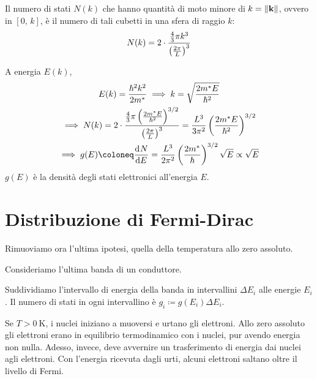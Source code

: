 Il numero di stati $N(k)$ che hanno quantità di moto minore di $k = \left\lVert \mathbf{k} \right\rVert$, ovvero in $[0, \, k]$, è il numero di tali cubetti in una sfera di raggio $k$:
\begin{equation}
    N(k) = 2 \cdot \frac{\frac{4}{3} \pi k^3}{\left( \frac{2\pi}{L} \right)^3}
\end{equation}

A energia $E(k)$,
\begin{gather}
    E(k) = \frac{\hbar^2 k^2}{2 m^*}
    \implies k = \sqrt{\frac{2 m^* E}{\hbar^2}} \\
    \implies N(k) = 2 \cdot \frac{\frac{4}{3} \pi \pts{\frac{2 m^* E}{\hbar^2}}^{3/2}}{\pts{\frac{2\pi}{L}}^3}
    = \frac{L^3}{3 \pi^2} \pts{\frac{2 m^* E}{\hbar^2}}^{3/2} \\
    \implies g(E) \coloneq \der[N]{E} = \frac{L^3}{2 \pi^2} \pts{\frac{2 m^*}{\hbar}}^{3/2} \sqrt{E} \propto \sqrt{E}
\end{gather}
$g(E)$ è la densità degli stati elettronici all'energia $E$.


\section{Distribuzione di Fermi-Dirac}

Rimuoviamo ora l'ultima ipotesi, quella della temperatura allo zero assoluto.

Consideriamo l'ultima banda di un conduttore.

Suddividiamo l'intervallo di energia della banda in intervallini $\Delta E_i$ alle energie $E_i$.
Il numero di stati in ogni intervallino è $g_i \coloneq g(E_i) \Delta E_i$.

Se $T > \qty{0}{\kelvin}$, i nuclei iniziano a muoversi e urtano gli elettroni.
Allo zero assoluto gli elettroni erano in equilibrio termodinamico con i nuclei, pur avendo energia non nulla.
Adesso, invece, deve avvernire un trasferimento di energia dai nuclei agli elettroni.
Con l'energia ricevuta dagli urti, alcuni elettroni saltano oltre il livello di Fermi.

